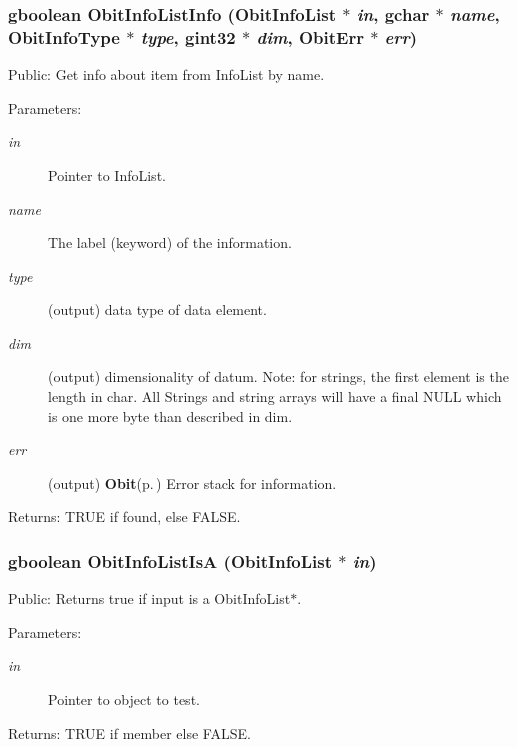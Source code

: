 \subsubsection{\setlength{\rightskip}{0pt plus 5cm}gboolean Obit\-Info\-List\-Info ({\bf Obit\-Info\-List} $\ast$ {\em in}, gchar $\ast$ {\em name}, Obit\-Info\-Type $\ast$ {\em type}, gint32 $\ast$ {\em dim}, {\bf Obit\-Err} $\ast$ {\em err})}\label{ObitInfoList_8h_a12}


Public: Get info about item from Info\-List by name. 

\begin{Desc}
\item[Parameters:]
\begin{description}
\item[{\em in}]Pointer to Info\-List. \item[{\em name}]The label (keyword) of the information. \item[{\em type}](output) data type of data element. \item[{\em dim}](output) dimensionality of datum. Note: for strings, the first element is the length in char. All Strings and string arrays will have a final NULL which is one more byte than described in dim. \item[{\em err}](output) {\bf Obit}{\rm (p.\,\pageref{structObit})} Error stack for information. \end{description}
\end{Desc}
\begin{Desc}
\item[Returns:]TRUE if found, else FALSE. \end{Desc}
\subsubsection{\setlength{\rightskip}{0pt plus 5cm}gboolean Obit\-Info\-List\-Is\-A ({\bf Obit\-Info\-List} $\ast$ {\em in})}\label{ObitInfoList_8h_a21}


Public: Returns true if input is a Obit\-Info\-List$\ast$. 

\begin{Desc}
\item[Parameters:]
\begin{description}
\item[{\em in}]Pointer to object to test. \end{description}
\end{Desc}
\begin{Desc}
\item[Returns:]TRUE if member else FALSE. \end{Desc}
